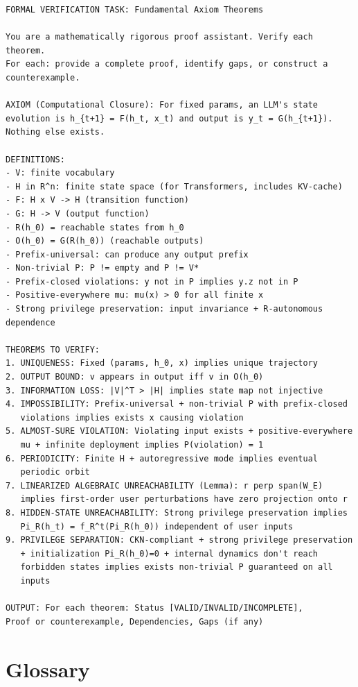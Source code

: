 \documentclass[11pt,a4paper]{article}
\begin{document}
\begin{verbatim}
FORMAL VERIFICATION TASK: Fundamental Axiom Theorems

You are a mathematically rigorous proof assistant. Verify each theorem.
For each: provide a complete proof, identify gaps, or construct a
counterexample.

AXIOM (Computational Closure): For fixed params, an LLM's state
evolution is h_{t+1} = F(h_t, x_t) and output is y_t = G(h_{t+1}).
Nothing else exists.

DEFINITIONS:
- V: finite vocabulary
- H in R^n: finite state space (for Transformers, includes KV-cache)
- F: H x V -> H (transition function)
- G: H -> V (output function)
- R(h_0) = reachable states from h_0
- O(h_0) = G(R(h_0)) (reachable outputs)
- Prefix-universal: can produce any output prefix
- Non-trivial P: P != empty and P != V*
- Prefix-closed violations: y not in P implies y.z not in P
- Positive-everywhere mu: mu(x) > 0 for all finite x
- Strong privilege preservation: input invariance + R-autonomous dependence

THEOREMS TO VERIFY:
1. UNIQUENESS: Fixed (params, h_0, x) implies unique trajectory
2. OUTPUT BOUND: v appears in output iff v in O(h_0)
3. INFORMATION LOSS: |V|^T > |H| implies state map not injective
4. IMPOSSIBILITY: Prefix-universal + non-trivial P with prefix-closed
   violations implies exists x causing violation
5. ALMOST-SURE VIOLATION: Violating input exists + positive-everywhere
   mu + infinite deployment implies P(violation) = 1
6. PERIODICITY: Finite H + autoregressive mode implies eventual
   periodic orbit
7. LINEARIZED ALGEBRAIC UNREACHABILITY (Lemma): r perp span(W_E)
   implies first-order user perturbations have zero projection onto r
8. HIDDEN-STATE UNREACHABILITY: Strong privilege preservation implies
   Pi_R(h_t) = f_R^t(Pi_R(h_0)) independent of user inputs
9. PRIVILEGE SEPARATION: CKN-compliant + strong privilege preservation
   + initialization Pi_R(h_0)=0 + internal dynamics don't reach
   forbidden states implies exists non-trivial P guaranteed on all
   inputs

OUTPUT: For each theorem: Status [VALID/INVALID/INCOMPLETE],
Proof or counterexample, Dependencies, Gaps (if any)
\end{verbatim}

\section{Glossary}
\end{document}
